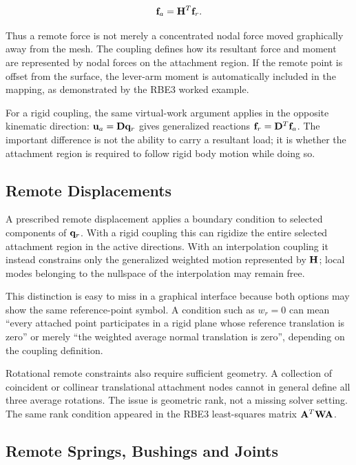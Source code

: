 \begin{equation}
    \mathbf{f}_a=\mathbf{H}^T\mathbf{f}_r.
\end{equation}

Thus a remote force is not merely a concentrated nodal force moved graphically
away from the mesh. The coupling defines how its resultant force and moment are
represented by nodal forces on the attachment region. If the remote point is
offset from the surface, the lever-arm moment is automatically included in the
mapping, as demonstrated by the RBE3 worked example.

For a rigid coupling, the same virtual-work argument applies in the opposite
kinematic direction: $\mathbf{u}_a=\mathbf{D}\mathbf{q}_r$ gives generalized reactions
$\mathbf{f}_r=\mathbf{D}^T\mathbf{f}_a$. The important difference is not the ability to carry a
resultant load; it is whether the attachment region is required to follow rigid
body motion while doing so.

\subsection{Remote Displacements}

A prescribed remote displacement applies a boundary condition to selected
components of $\mathbf{q}_r$. With a rigid coupling this can rigidize the entire
selected attachment region in the active directions. With an interpolation
coupling it instead constrains only the generalized weighted motion represented
by $\mathbf{H}$; local modes belonging to the nullspace of the interpolation may
remain free.

This distinction is easy to miss in a graphical interface because both options
may show the same reference-point symbol. A condition such as $w_r=0$ can mean
``every attached point participates in a rigid plane whose reference translation
is zero'' or merely ``the weighted average normal translation is zero'',
depending on the coupling definition.

Rotational remote constraints also require sufficient geometry. A collection of
coincident or collinear translational attachment nodes cannot in general define
all three average rotations. The issue is geometric rank, not a missing solver
setting. The same rank condition appeared in the RBE3 least-squares matrix
$\mathbf{A}^T\mathbf{W}\mathbf{A}$.

\subsection{Remote Springs, Bushings and Joints}

